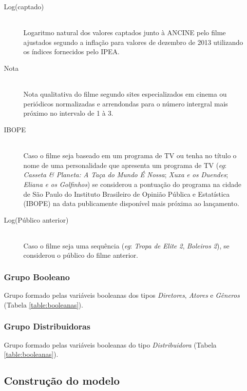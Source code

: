 \documentclass[11pt,a4paper]{article}
\begin{document}
\begin{description}

  \item[Log(captado)] \hfill \\
  Logaritmo natural dos valores captados junto à ANCINE pelo filme ajustados segundo a inflação para valores de dezembro de 2013 utilizando os índices fornecidos pelo IPEA.
  \item[Nota] \hfill \\
  Nota qualitativa do filme segundo sites especializados em cinema ou periódicos normalizadas e arrendondas para o número intergral mais próximo no intervalo de 1 à 3.
  \item[IBOPE] \hfill \\
  Caso o filme seja baseado em um programa de TV ou tenha no título o nome de uma personalidade que apresenta um programa de TV (\textit{eg}: \textit{Casseta \& Planeta: A Taça do Mundo É Nossa}; \textit{Xuxa e os Duendes}; \textit{Eliana e os Golfinhos}) se considerou a pontuação do programa na cidade de São Paulo do Instituto Brasileiro de Opinião Pública e Estatística (IBOPE) na data publicamente disponível mais próxima ao lançamento.  
  \item[Log(Público anterior)] \hfill \\
  Caso o filme seja uma sequência (\textit{eg}: \textit{Tropa de Elite 2}, \textit{Boleiros 2}), se considerou o público do filme anterior.  
\end{description}



\subsubsection{Grupo Booleano}

Grupo formado pelas variáveis booleanas dos tipos \textit{Diretores}, \textit{Atores} e \textit{Gêneros} (Tabela \ref{table:booleanas}).

\subsubsection{Grupo Distribuidoras}

Grupo formado pelas variáveis booleanas do tipo \textit{Distribuidora} (Tabela \ref{table:booleanas}).

\subsection{Construção do modelo}
\end{document}
